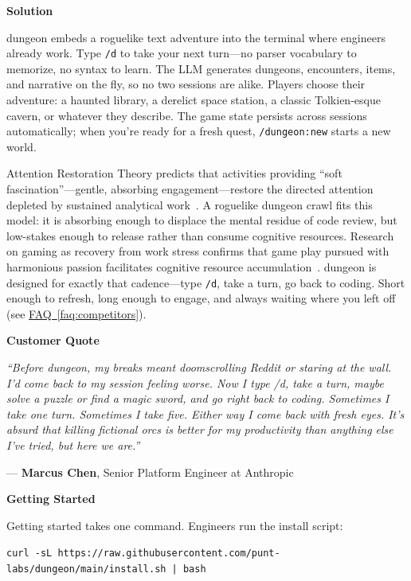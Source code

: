 \documentclass[11pt,letterpaper]{article}
\newcommand{\prsection}[1]{%
  \vspace{1em}%
  {\large\bfseries\color{SectionBlue}#1}%
  \vspace{0.3em}\par%
}
\newcommand{\faqref}[1]{\hyperref[#1]{FAQ~\ref*{#1}}}
\begin{document}
\prsection{Solution}

dungeon embeds a roguelike text adventure into the terminal where engineers already work. Type \texttt{/d} to take your next turn---no parser vocabulary to memorize, no syntax to learn. The LLM generates dungeons, encounters, items, and narrative on the fly, so no two sessions are alike. Players choose their adventure: a haunted library, a derelict space station, a classic Tolkien-esque cavern, or whatever they describe. The game state persists across sessions automatically; when you're ready for a fresh quest, \texttt{/dungeon:new} starts a new world.

Attention Restoration Theory predicts that activities providing ``soft fascination''---gentle, absorbing engagement---restore the directed attention depleted by sustained analytical work~\cite{kaplan1995art}. A roguelike dungeon crawl fits this model: it is absorbing enough to displace the mental residue of code review, but low-stakes enough to release rather than consume cognitive resources. Research on gaming as recovery from work stress confirms that game play pursued with harmonious passion facilitates cognitive resource accumulation~\cite{kocak2024gaming}. dungeon is designed for exactly that cadence---type \texttt{/d}, take a turn, go back to coding. Short enough to refresh, long enough to engage, and always waiting where you left off (see \faqref{faq:competitors}).

\prsection{Customer Quote}

\begin{customerquote}
\textit{``Before dungeon, my breaks meant doomscrolling Reddit or staring at the wall. I'd come back to my session feeling worse. Now I type /d, take a turn, maybe solve a puzzle or find a magic sword, and go right back to coding. Sometimes I take one turn. Sometimes I take five. Either way I come back with fresh eyes. It's absurd that killing fictional orcs is better for my productivity than anything else I've tried, but here we are.''}

\raggedleft --- \textbf{Marcus Chen}, Senior Platform Engineer at Anthropic
\end{customerquote}

\prsection{Getting Started}

Getting started takes one command. Engineers run the install script:

\begin{center}
{\small\texttt{curl -sL https://raw.githubusercontent.com/punt-labs/dungeon/main/install.sh | bash}}
\end{center}
\end{document}
